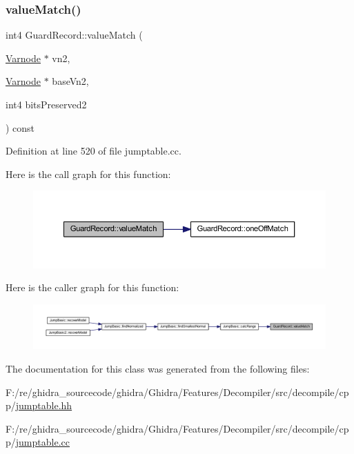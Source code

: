 \subsubsection{\texorpdfstring{valueMatch()}{valueMatch()}}
{\footnotesize\ttfamily int4 Guard\+Record\+::value\+Match (\begin{DoxyParamCaption}\item[{\mbox{\hyperlink{class_varnode}{Varnode}} $\ast$}]{vn2,  }\item[{\mbox{\hyperlink{class_varnode}{Varnode}} $\ast$}]{base\+Vn2,  }\item[{int4}]{bits\+Preserved2 }\end{DoxyParamCaption}) const}



Definition at line 520 of file jumptable.\+cc.

Here is the call graph for this function\+:
\nopagebreak
\begin{figure}[H]
\begin{center}
\leavevmode
\includegraphics[width=350pt]{class_guard_record_ab7999653314e91a17845f7f8eb92a3ec_cgraph}
\end{center}
\end{figure}
Here is the caller graph for this function\+:
\nopagebreak
\begin{figure}[H]
\begin{center}
\leavevmode
\includegraphics[width=350pt]{class_guard_record_ab7999653314e91a17845f7f8eb92a3ec_icgraph}
\end{center}
\end{figure}


The documentation for this class was generated from the following files\+:\begin{DoxyCompactItemize}
\item 
F\+:/re/ghidra\+\_\+sourcecode/ghidra/\+Ghidra/\+Features/\+Decompiler/src/decompile/cpp/\mbox{\hyperlink{jumptable_8hh}{jumptable.\+hh}}\item 
F\+:/re/ghidra\+\_\+sourcecode/ghidra/\+Ghidra/\+Features/\+Decompiler/src/decompile/cpp/\mbox{\hyperlink{jumptable_8cc}{jumptable.\+cc}}\end{DoxyCompactItemize}
